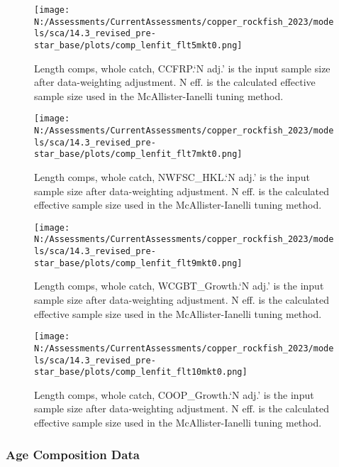 \documentclass[11pt,
  english,
  letterpaper,
]{article}
\begin{document}
\begin{figure}
\centering
\texttt{[image: N:/Assessments/CurrentAssessments/copper\_rockfish\_2023/models/sca/14.3\_revised\_pre-star\_base/plots/comp\_lenfit\_flt5mkt0.png]}
\caption{Length comps, whole catch, CCFRP.`N adj.' is the input sample size after data-weighting adjustment. N eff. is the calculated effective sample size used in the McAllister-Ianelli tuning method.\label{fig:comp_lenfit_flt5mkt0}}
\end{figure}

\begin{figure}
\centering
\texttt{[image: N:/Assessments/CurrentAssessments/copper\_rockfish\_2023/models/sca/14.3\_revised\_pre-star\_base/plots/comp\_lenfit\_flt7mkt0.png]}
\caption{Length comps, whole catch, NWFSC\_HKL.`N adj.' is the input sample size after data-weighting adjustment. N eff. is the calculated effective sample size used in the McAllister-Ianelli tuning method.\label{fig:comp_lenfit_flt7mkt0}}
\end{figure}

\begin{figure}
\centering
\texttt{[image: N:/Assessments/CurrentAssessments/copper\_rockfish\_2023/models/sca/14.3\_revised\_pre-star\_base/plots/comp\_lenfit\_flt9mkt0.png]}
\caption{Length comps, whole catch, WCGBT\_Growth.`N adj.' is the input sample size after data-weighting adjustment. N eff. is the calculated effective sample size used in the McAllister-Ianelli tuning method.\label{fig:comp_lenfit_flt9mkt0}}
\end{figure}

\begin{figure}
\centering
\texttt{[image: N:/Assessments/CurrentAssessments/copper\_rockfish\_2023/models/sca/14.3\_revised\_pre-star\_base/plots/comp\_lenfit\_flt10mkt0.png]}
\caption{Length comps, whole catch, COOP\_Growth.`N adj.' is the input sample size after data-weighting adjustment. N eff. is the calculated effective sample size used in the McAllister-Ianelli tuning method.\label{fig:comp_lenfit_flt10mkt0}}
\end{figure}

\newpage

\hypertarget{age-data}{%
\subsubsection{Age Composition Data}\label{age-data}}
\end{document}
